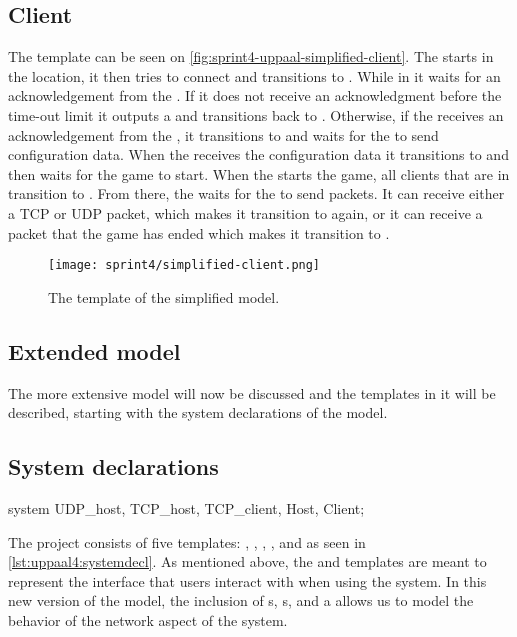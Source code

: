\subsection*{Client}
The  template can be seen on \autoref{fig:sprint4-uppaal-simplified-client}.
The  starts in the  location, it then tries to connect and transitions to .
While in  it waits for an acknowledgement from the .
If it does not receive an acknowledgment before the time-out limit it outputs a  and transitions back to .
Otherwise, if the  receives an acknowledgement from the , it transitions to  and waits for the  to send configuration data.
When the  receives the configuration data it transitions to  and then waits for the game to start.
When the  starts the game, all clients that are in  transition to .
From there, the  waits for the  to send packets.
It can receive either a TCP or UDP packet, which makes it transition to  again, or it can receive a packet that the game has ended which makes it transition to .
\begin{figure}[h]
    \centering
    \texttt{[image: sprint4/simplified-client.png]}
    \caption{The  template of the simplified \uppaal model.}
    \label{fig:sprint4-uppaal-simplified-client}
\end{figure}

\subsection{Extended \uppaal model}
The more extensive \uppaal model will now be discussed and the templates in it will be described, starting with the system declarations of the model.

\subsection*{System declarations}
\begin{uppaalcode}[caption={System declarations}, label={lst:uppaal4:systemdecl},captionpos=b]
    system UDP_host, TCP_host, TCP_client, Host, Client;
\end{uppaalcode}
The project consists of five templates: , , , , and  as seen in \autoref{lst:uppaal4:systemdecl}.
As mentioned above, the  and  templates are meant to represent the interface that users interact with when using the system.
In this new version of the model, the inclusion of s, s, and a  allows us to model the behavior of the network aspect of the system.

